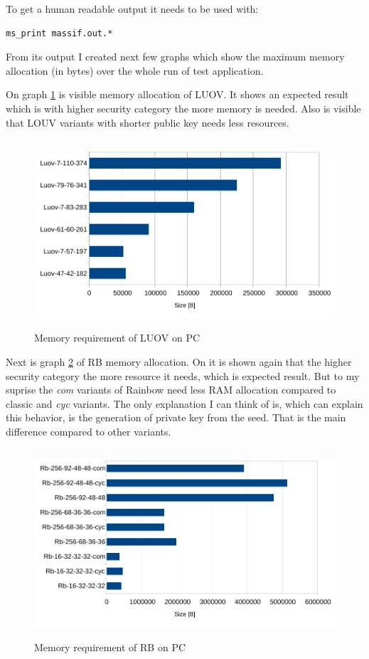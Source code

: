\documentclass[thesis=M,english]{FITthesis}[2019/12/23]
\begin{document}
\noindent
To get a human readable output it needs to be used with:
\begin{lstlisting}[frame=single]
ms_print massif.out.*
\end{lstlisting}
\noindent
From its output I created next few graphs which show the maximum memory allocation (in bytes) over the whole run of test application. 

\bigskip
\noindent
On graph \ref{mem-pc-luov} is visible memory allocation of LUOV. It shows an expected result which is with higher security category the more memory is needed. Also is visible that LOUV variants with shorter public key needs less resources.

\begin{figure}[H]
\centering
\includegraphics[width=13cm,height=7cm]{images/mem-pc-luov.pdf}
\caption{Memory requirement of LUOV on PC}
\label{mem-pc-luov}
\end{figure}

\noindent
Next is graph \ref{mem-pc-rb} of RB memory allocation. On it is shown again that the higher security category the more resource it needs, which is expected result. But to my suprise the \textit{com} variants of Rainbow need less RAM allocation compared to classic and \textit{cyc} variants. The only explanation I can think of is, which can explain this behavior, is the generation of private key from the seed. That is the main difference compared to other variants.
\begin{figure}[H]
\centering
\includegraphics[width=13cm,height=7cm]{images/mem-pc-rb.pdf}
\caption{Memory requirement of RB on PC}
\label{mem-pc-rb}
\end{figure}
\end{document}

